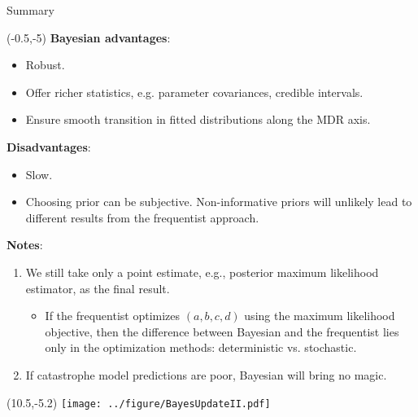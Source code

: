 \documentclass[aspectratio=169]{beamer}
\begin{document}
\begin{frame}{Summary}

\begin{textblock}{9}(-0.5,-5)
\tiny \textbf{Bayesian advantages}:\medskip

\begin{itemize}
\tiny\item Robust.\medskip

\tiny \item Offer richer statistics, e.g. parameter covariances, credible intervals.\medskip

\tiny \item Ensure smooth transition in fitted distributions along the MDR axis.\medskip
\end{itemize}

\tiny \textbf{Disadvantages}:\medskip

\tiny \begin{itemize}
\item Slow. \medskip

\item Choosing prior can be subjective. Non-informative priors will unlikely lead to different results from the frequentist approach.\medskip
\end{itemize}

\tiny \textbf{Notes}: \medskip 

\tiny \begin{enumerate}

\item We still take only a point estimate, e.g., posterior maximum likelihood estimator, as the final result.\medskip 

\begin{itemize}
\tiny\item If the frequentist optimizes $(a, b, c, d)$ using the maximum likelihood objective, then the difference between Bayesian and the frequentist lies only in the optimization methods: deterministic vs. stochastic.\medskip 
\end{itemize}

\item If catastrophe model predictions are poor, Bayesian will bring no magic. 
\end{enumerate}


\end{textblock}




\begin{textblock}{1}(10.5,-5.2)
\texttt{[image: ../figure/BayesUpdateII.pdf]}
\end{textblock}
\end{frame}
\end{document}
